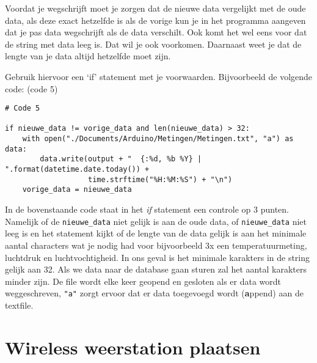 Voordat je wegschrijft moet je zorgen dat de nieuwe data vergelijkt met
de oude data, als deze exact hetzelfde is als de vorige kun je in het
programma aangeven dat je pas data wegschrijft als de data verschilt.
Ook komt het wel eens voor dat de string met data leeg is. Dat wil je
ook voorkomen. Daarnaast weet je dat de lengte van je data altijd
hetzelfde moet zijn.

Gebruik hiervoor een `if' statement met je voorwaarden. Bijvoorbeeld de volgende code:
(code 5)

\begin{verbatim}
# Code 5

if nieuwe_data != vorige_data and len(nieuwe_data) > 32:
    with open("./Documents/Arduino/Metingen/Metingen.txt", "a") as data:
        data.write(output + "  {:%d, %b %Y} | ".format(datetime.date.today()) +
                   time.strftime("%H:%M:%S") + "\n")
    vorige_data = nieuwe_data
\end{verbatim}

In de bovenstaande code staat in het \textit{if} statement een controle op 3
punten. Namelijk of de \verb|nieuwe_data| niet gelijk is aan de oude data, of
\verb|nieuwe_data| niet leeg is en het statement kijkt of de lengte van de data
gelijk is aan het minimale aantal characters wat je nodig had voor
bijvoorbeeld 3x een temperatuurmeting, luchtdruk en luchtvochtigheid. In ons geval is 
het minimale karakters in de string gelijk aan 32. Als we data naar de \hisparc database gaan
sturen zal het aantal karakters minder zijn. 
De file wordt elke keer geopend en gesloten als er data wordt weggeschreven, \verb|"a"|
zorgt ervoor dat er data toegevoegd wordt (\textbf{a}ppend) aan de textfile.

\section{Wireless weerstation plaatsen}

